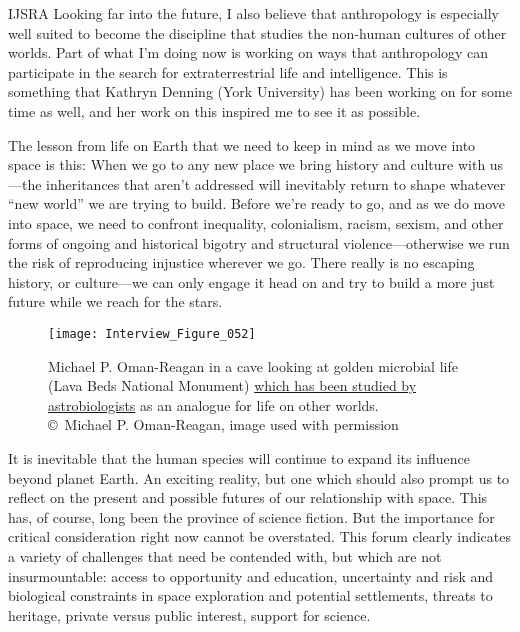 \begin{labeling}{IJSRA}
	Looking far into the future, I also believe that anthropology is especially well suited to become the discipline that studies the non-human cultures of other worlds. Part of what I’m doing now is working on ways that anthropology can participate in the search for extraterrestrial life and intelligence. This is something that Kathryn Denning (York University) has been working on for some time as well, and her work on this inspired me to see it as possible.

	The lesson from life on Earth that we need to keep in mind as we move into space is this: When we go to any new place we bring history and culture with us—the inheritances that aren't addressed will inevitably return to shape whatever “new world” we are trying to build. Before we’re ready to go, and as we do move into space, we need to confront inequality, colonialism, racism, sexism, and other forms of ongoing and historical bigotry and structural violence—otherwise we run the risk of reproducing injustice wherever we go. There really is no escaping history, or culture—we can only engage it head on and try to build a more just future while we reach for the stars.

\begin{figure}[!tb]
	\texttt{[image: Interview\_Figure\_052]}
	\centering
	\caption{Michael P. Oman-Reagan in a cave looking at golden microbial life (Lava Beds National Monument) \href{<https://www.smithsonianmag.com/travel/how-bacteria-make-underground-cave-shine-gold-and-why-nasa-wants-study-them-180955670/>}{which has been studied by astrobiologists} as an analogue for life on other worlds.
		{\normalfont\scriptsize \\ \copyright\ Michael P. Oman-Reagan, image used with permission
	}}
	\label{Interview_Figure_052}
\end{figure}

\end{labeling}

\IJSRAseparator


It is inevitable that the human species will continue to expand its influence beyond planet Earth. An exciting reality, but one which should also prompt us to reflect on the present and possible futures of our relationship with space. This has, of course, long been the province of science fiction. But the importance for critical consideration right now cannot be overstated. This forum clearly indicates a variety of challenges that need be contended with, but which are not insurmountable: access to opportunity and education, uncertainty and risk and biological constraints in space exploration and potential settlements, threats to heritage, private versus public interest, support for science.


